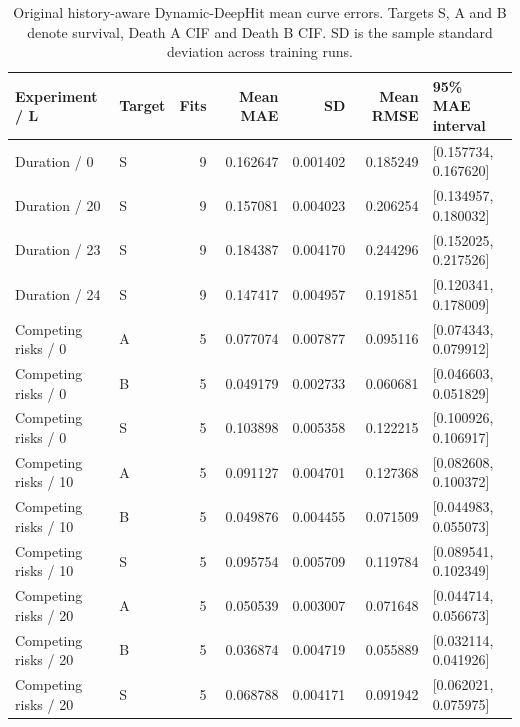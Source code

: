 \begin{table}[htbp]\centering\small
\caption{Original history-aware Dynamic-DeepHit mean curve errors. Targets S, A and B denote survival, Death A CIF and Death B CIF. SD is the sample standard deviation across training runs.}\label{tab:originalddh_summary}
\begin{tabular}{llrrrrl}\toprule
Experiment / L & Target & Fits & Mean MAE & SD & Mean RMSE & 95\% MAE interval\\\midrule
Duration / 0 & S & 9 & 0.162647 & 0.001402 & 0.185249 & [0.157734, 0.167620]\\
Duration / 20 & S & 9 & 0.157081 & 0.004023 & 0.206254 & [0.134957, 0.180032]\\
Duration / 23 & S & 9 & 0.184387 & 0.004170 & 0.244296 & [0.152025, 0.217526]\\
Duration / 24 & S & 9 & 0.147417 & 0.004957 & 0.191851 & [0.120341, 0.178009]\\
Competing risks / 0 & A & 5 & 0.077074 & 0.007877 & 0.095116 & [0.074343, 0.079912]\\
Competing risks / 0 & B & 5 & 0.049179 & 0.002733 & 0.060681 & [0.046603, 0.051829]\\
Competing risks / 0 & S & 5 & 0.103898 & 0.005358 & 0.122215 & [0.100926, 0.106917]\\
Competing risks / 10 & A & 5 & 0.091127 & 0.004701 & 0.127368 & [0.082608, 0.100372]\\
Competing risks / 10 & B & 5 & 0.049876 & 0.004455 & 0.071509 & [0.044983, 0.055073]\\
Competing risks / 10 & S & 5 & 0.095754 & 0.005709 & 0.119784 & [0.089541, 0.102349]\\
Competing risks / 20 & A & 5 & 0.050539 & 0.003007 & 0.071648 & [0.044714, 0.056673]\\
Competing risks / 20 & B & 5 & 0.036874 & 0.004719 & 0.055889 & [0.032114, 0.041926]\\
Competing risks / 20 & S & 5 & 0.068788 & 0.004171 & 0.091942 & [0.062021, 0.075975]\\
\bottomrule\end{tabular}
\end{table}

